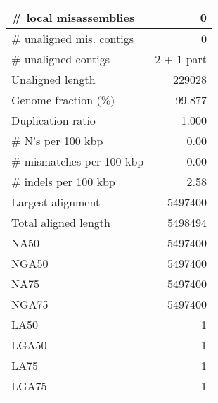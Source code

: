 \documentclass[12pt,a4paper]{article}
\begin{document}
\begin{table}[ht]
\begin{center}
\begin{tabular}{|l*{1}{|r}|}
\# local misassemblies & 0 \\ \hline
\# unaligned mis. contigs & 0 \\ \hline
\# unaligned contigs & 2 + 1 part \\ \hline
Unaligned length & 229028 \\ \hline
Genome fraction (\%) & 99.877 \\ \hline
Duplication ratio & 1.000 \\ \hline
\# N's per 100 kbp & 0.00 \\ \hline
\# mismatches per 100 kbp & 0.00 \\ \hline
\# indels per 100 kbp & 2.58 \\ \hline
Largest alignment & 5497400 \\ \hline
Total aligned length & 5498494 \\ \hline
NA50 & 5497400 \\ \hline
NGA50 & 5497400 \\ \hline
NA75 & 5497400 \\ \hline
NGA75 & 5497400 \\ \hline
LA50 & 1 \\ \hline
LGA50 & 1 \\ \hline
LA75 & 1 \\ \hline
LGA75 & 1 \\ \hline
\end{tabular}
\end{center}
\end{table}
\end{document}
